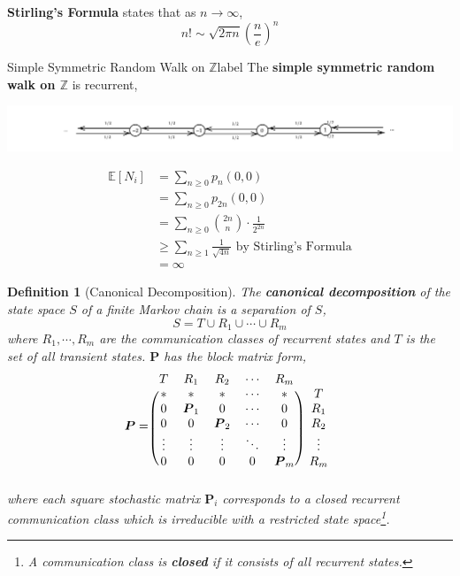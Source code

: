 \documentclass{tufte-handout}
\newtheorem{defn}[thm]{Definition}
\begin{document}
  \begin{marginfigure}
    \textbf{Stirling's Formula} states that as $n \rightarrow \infty$,
    \[n ! \sim \sqrt{2 \pi n}\left(\frac{n}{e}\right)^{n}\]
  \end{marginfigure}

  \begin{ex}{Simple Symmetric Random Walk on $\mathbb{Z}$}{label}
  The \textbf{simple symmetric random walk on $\mathbb{Z}$} is recurrent,
  \begin{center}
  \includegraphics[width=\textwidth]{fig-14.png}
  \end{center}
  \begin{align*}
    \mathbb{E}[N_i] &= \sum_{n \geq 0} p_n(0,0) \\
                    &= \sum_{n \geq 0} p_{2n}(0,0) \\
                    &= \sum_{n \geq 0} \binom{2n}{n} \cdot \frac{1}{2^{2n}} \\
                    &\geq \sum_{n \geq 1} \frac{1}{\sqrt{4n}} \text{ by Stirling's Formula} \\
                    &= \infty
  \end{align*}
  \end{ex}

  \begin{defn}[Canonical Decomposition]
    The \textbf{canonical decomposition} of the state space $S$ of a finite Markov chain is a separation of $S$,
    \[S = T \cup R_1 \cup \cdots \cup R_m\]
    \noindent where $R_1, \cdots, R_m$ are the communication classes of recurrent states and $T$ is the set of all transient states. $\boldsymbol{P}$ has the block matrix form,
    \[
    \boldsymbol{P} = \begin{blockarray}{cccccc}
    T & R_1 & R_2 & \cdots & R_m \\
    \begin{block}{(ccccc)c}
      * & * & * & \cdots & * & T \\
      0 & \boldsymbol{P}_1 & 0 & \cdots & 0 & R_1 \\
      0 & 0 & \boldsymbol{P}_2 & \cdots & 0 & R_2 \\
      \vdots & \vdots & \vdots & \ddots &  \vdots & \vdots \\
      0 & 0 & 0 & 0 & \boldsymbol{P}_m & R_m \\
    \end{block}
    \end{blockarray}
     \]
     \noindent where each square stochastic matrix $\boldsymbol{P}_i$ corresponds to a closed recurrent communication class which is irreducible with a restricted state space\footnote{A communication class is \textbf{closed} if it consists of all recurrent states.}.
    \end{defn}
\end{document}
